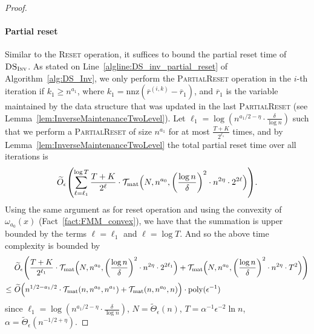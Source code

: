 \documentclass[11pt]{article}
\newcommand{\Tmat}{\mathcal{T}_{\mathrm{mat}}}
\newcommand{\nnz}{\mathrm{nnz}}
\let\originalleft\left
\let\originalright\right
\renewcommand{\left}{\mathopen{}\mathclose\bgroup\originalleft}
\renewcommand{\right}{\aftergroup\egroup\originalright}
\newcommand\rr{\boldsymbol{\mathit{r}}}
\newcommand\Otil{\widetilde{O}}
\newcommand{\wt}{\widetilde}
\newcommand{\ov}{\overline}
\DeclareMathOperator*{\poly}{{\mathrm{poly}}}
\begin{document}
\begin{proof}
\paragraph{Partial reset} Similar to the \textsc{Reset} operation, it suffices to bound the partial reset time of $\textsc{DS}_{\textsc{Inv}}$. As stated on Line~\ref{algline:DS_inv_partial_reset} of Algorithm~\ref{alg:DS_Inv}, we only perform the \textsc{PartialReset} operation in the $i$-th iteration if $k_1 \geq n^{a_1}$, where $k_1 = \nnz(\ov{\rr}^{(i,k)} - \ov{\rr}_1)$, and $\ov{\rr}_1$ is the variable maintained by the data structure that was updated in the last \textsc{PartialReset} (see Lemma~\ref{lem:InverseMaintenanceTwoLevel}).  Let $\ell_1 = \log (n^{a_1/2 - \eta} \cdot \frac{\delta}{\log n})$ such that we perform a \textsc{PartialReset} of size $n^{a_1}$ for at most $\frac{T+K}{2^{\ell_1}}$ times, and by Lemma~\ref{lem:InverseMaintenanceTwoLevel} the total partial reset time over all iterations is
\begin{align*}
\Otil_{\epsilon}\left(\sum_{\ell = \ell_1}^{\log T} \frac{T+K}{2^{\ell}} \cdot \Tmat\Big(N, n^{a_0}, \left(\frac{\log n}{\delta}\right)^2 \cdot n^{2 \eta} \cdot 2^{2 \ell}\Big)\right). 
\end{align*}
Using the same argument as for reset operation and using the convexity of $\omega_{a_0}(x)$ (Fact~\ref{fact:FMM_convex}), we have that the summation is upper bounded by the terms $\ell=\ell_1$ and $\ell = \log T$. And so the above time complexity is bounded by
\begin{align*}
&~ \Otil_{\epsilon}\left(\frac{T+K}{2^{\ell_1}} \cdot \Tmat\Big(N, n^{a_0}, \left(\frac{\log n}{\delta}\right)^2 \cdot n^{2 \eta} \cdot 2^{2 \ell_1}\Big) + \Tmat\Big( N, n^{a_0}, \left(\frac{\log n}{\delta}\right)^2 \cdot n^{2 \eta} \cdot T^2\Big)\right) \\
\leq &~ \wt{O}\left( n^{1/2-a_1/2} \cdot \Tmat(n, n^{a_0}, n^{a_1}) + \Tmat(n, n^{a_0}, n) \right) \cdot \poly(\epsilon^{-1})
\end{align*}
since $\ell_1 = \log (n^{a_1/2 - \eta} \cdot \frac{\delta}{\log n})$, $N = \widetilde{\Theta}_{\epsilon}(n )$, $T = \alpha^{-1}\epsilon^{-2}\ln n$, $\alpha = \widetilde{\Theta}_{\epsilon}(n^{-1/2+\eta})$. 


\end{proof}
\end{document}
